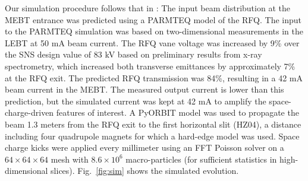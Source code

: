 \documentclass[%
 reprint,
 amsmath,amssymb,
 aps,
prstab,
]{revtex4-2}
\begin{document}
Our simulation procedure follows that in \cite{Ruisard2020}: The input beam distribution at the MEBT entrance was predicted using a PARMTEQ \cite{Crandall1988a} model of the RFQ. The input to the PARMTEQ simulation was based on two-dimensional measurements in the LEBT at 50 mA beam current. The RFQ vane voltage was increased by 9\% over the SNS design value of 83 kV based on preliminary results from x-ray spectrometry, which increased both transverse emittances by approximately 7\% at the RFQ exit. The predicted RFQ transmission was 84\%, resulting in a 42 mA beam current in the MEBT. The measured output current is lower than this prediction, but the simulated current was kept at 42 mA to amplify the space-charge-driven features of interest. A PyORBIT \cite{Shishlo2015} model was used to propagate the beam 1.3 meters from the RFQ exit to the first horizontal slit (HZ04), a distance including four quadrupole magnets for which a hard-edge model was used. Space charge kicks were applied every millimeter using an FFT Poisson solver on a $64 \times 64 \times 64$ mesh with $8.6 \times 10^6$ macro-particles (for sufficient statistics in high-dimensional slices). Fig.~\ref{fig:sim} shows the simulated evolution.
%
\end{document}

